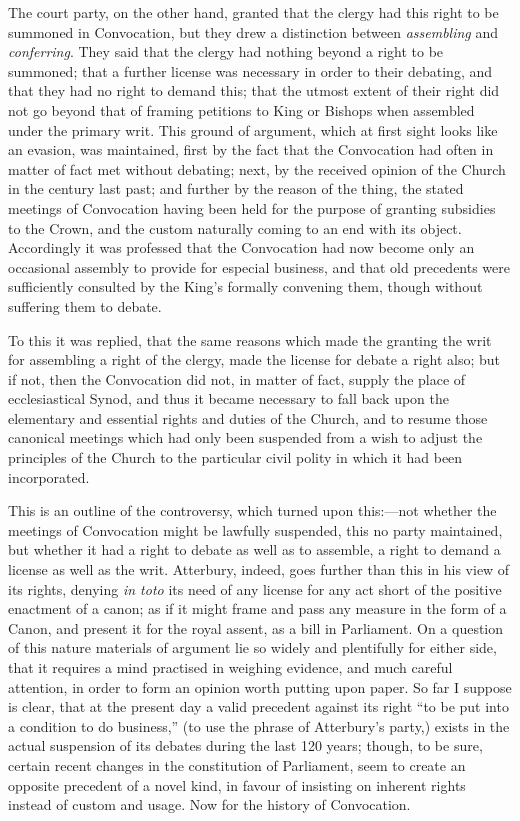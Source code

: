 The court party, on the other
hand, granted that the clergy had this right to be summoned in
Convocation, but they drew a distinction between \emph{assembling} and
\emph{conferring}. They said that the clergy had nothing beyond a
right to be summoned; that a further license was necessary in order to
their debating, and that they had no right to demand this; that the
utmost extent of their right did not go beyond that of framing
petitions to King or Bishops when assembled under the primary writ.
This ground of argument, which at first sight looks like an evasion,
was maintained, first by the fact that the Convocation had often in
matter of fact met without debating; next, by the received opinion of
the Church in the century last past; and further by the reason of the
thing, the stated meetings of Convocation having been held for the
purpose of granting subsidies to the Crown, and the custom naturally
coming to an end with its object. Accordingly it was professed that
the Convocation had now become only an occasional assembly to provide
for especial business, and that old precedents were sufficiently
consulted by the King's formally convening them, though without
suffering them to debate.

To this it was replied, that
the same reasons which made the granting the writ for assembling a
right of the clergy, made the license for debate a right also; but if
not, then the Convocation did not, in matter of fact, supply the place
of ecclesiastical Synod, and thus it became necessary to fall back
upon the elementary and essential rights and duties of the Church, and
to resume those canonical meetings which had only been suspended from a wish to adjust the principles of the Church to the particular
civil polity in which it had been incorporated.

This is an outline of the
controversy, which turned upon this:—not whether the meetings of
Convocation might be lawfully suspended, this no party maintained, but
whether it had a right to debate as well as to assemble, a right to
demand a license as well as the writ. Atterbury, indeed, goes further
than this in his view of its rights, denying \emph{in toto} its need
of any license for any act short of the positive enactment of a canon;
as if it might frame and pass any measure in the form of a Canon, and
present it for the royal assent, as a bill in Parliament. On a
question of this nature materials of argument lie so widely and
plentifully for either side, that it requires a mind practised in
weighing evidence, and much careful attention, in order to form an
opinion worth putting upon paper. So far I suppose is clear, that at
the present day a valid precedent against its right ``to be put into a
condition to do business,'' (to use the phrase of Atterbury's party,)
exists in the actual suspension of its debates during the last 120
years; though, to be sure, certain recent changes in the constitution
of Parliament, seem to create an opposite precedent of a novel kind,
in favour of insisting on inherent rights instead of custom and usage.
Now for the history of Convocation.

